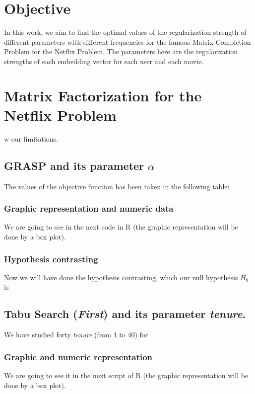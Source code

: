 \documentclass[11pt, english]{article}
\begin{document}
\tableofcontents
\newpage
\section{Objective}
In this work, we aim to find the optimal values of the regularization strength of different parameters with different frequencies for the famous Matrix Completion Problem for the Netflix Problem. The parameters here are the regularization strengths of each embedding vector for each user and each movie.  

\section{Matrix Factorization for the Netflix Problem}
w our limitations.


\subsection{GRASP and its parameter $\alpha$}
The values of the objective function has been taken in the following table:


\subsubsection{Graphic representation and numeric data}

We are going to see in the next code in R (the graphic representation will be done by a box plot). \\


\subsubsection{Hypothesis contrasting}
Now we will have done the hypothesis contrasting, which our null hypothesis $H_0$ is 
\subsection{Tabu Search (\textit{First}) and its parameter \textit{tenure}.}
We have studied forty \textit{tenure} (from 1 to 40) for \subsubsection{Graphic and numeric representation}
We are going to see it in the next script of R (the graphic representation will be done by a box plot).
\end{document}

